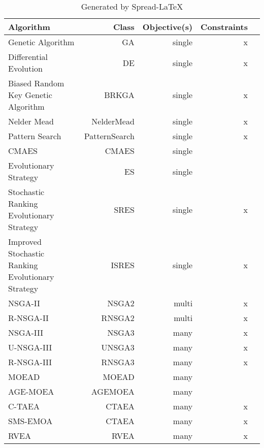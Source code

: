 \begin{table}[!htp]\centering
\caption{Generated by Spread-LaTeX}\label{tab: }
\scriptsize
\begin{tabular}{lrrrr}\toprule
\textbf{Algorithm} &\textbf{Class} &\textbf{Objective(s)} &\textbf{Constraints} \\\midrule
Genetic Algorithm &GA &single &x \\
Differential Evolution &DE &single &x \\
Biased Random Key Genetic Algorithm &BRKGA &single &x \\
Nelder Mead &NelderMead &single &x \\
Pattern Search &PatternSearch &single &x \\
CMAES &CMAES &single & \\
Evolutionary Strategy &ES &single & \\
Stochastic Ranking Evolutionary Strategy &SRES &single &x \\
Improved Stochastic Ranking Evolutionary Strategy &ISRES &single &x \\
NSGA-II &\cellcolor[HTML]{A8A8A8}NSGA2 &\cellcolor[HTML]{A8A8A8}multi &\cellcolor[HTML]{A8A8A8}x \\
R-NSGA-II &RNSGA2 &multi &x \\
NSGA-III &NSGA3 &many &x \\
U-NSGA-III &UNSGA3 &many &x \\
R-NSGA-III &RNSGA3 &many &x \\
MOEAD &MOEAD &many & \\
AGE-MOEA &AGEMOEA &many & \\
C-TAEA &CTAEA &many &x \\
SMS-EMOA &CTAEA &many &x \\
RVEA &RVEA &many &x \\
\bottomrule
\end{tabular}
\end{table}